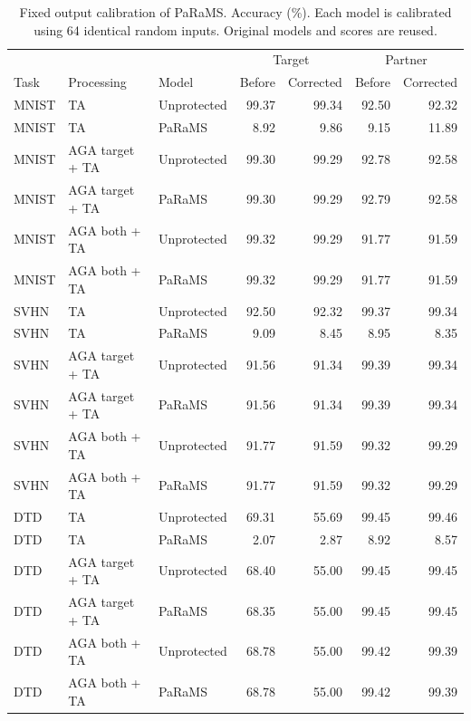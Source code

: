 \begin{table}[t]
\centering
\small
\caption{Fixed output calibration of PaRaMS. Accuracy (\%). Each model is calibrated using 64 identical random inputs. Original models and scores are reused.}
\begin{tabular}{lllrrrr}
\toprule
 & & & \multicolumn{2}{c}{Target} & \multicolumn{2}{c}{Partner} \\
Task & Processing & Model & Before & Corrected & Before & Corrected \\
\midrule
MNIST & TA & Unprotected & 99.37 & 99.34 & 92.50 & 92.32 \\
MNIST & TA & PaRaMS & 8.92 & 9.86 & 9.15 & 11.89 \\
MNIST & AGA target + TA & Unprotected & 99.30 & 99.29 & 92.78 & 92.58 \\
MNIST & AGA target + TA & PaRaMS & 99.30 & 99.29 & 92.79 & 92.58 \\
MNIST & AGA both + TA & Unprotected & 99.32 & 99.29 & 91.77 & 91.59 \\
MNIST & AGA both + TA & PaRaMS & 99.32 & 99.29 & 91.77 & 91.59 \\
SVHN & TA & Unprotected & 92.50 & 92.32 & 99.37 & 99.34 \\
SVHN & TA & PaRaMS & 9.09 & 8.45 & 8.95 & 8.35 \\
SVHN & AGA target + TA & Unprotected & 91.56 & 91.34 & 99.39 & 99.34 \\
SVHN & AGA target + TA & PaRaMS & 91.56 & 91.34 & 99.39 & 99.34 \\
SVHN & AGA both + TA & Unprotected & 91.77 & 91.59 & 99.32 & 99.29 \\
SVHN & AGA both + TA & PaRaMS & 91.77 & 91.59 & 99.32 & 99.29 \\
DTD & TA & Unprotected & 69.31 & 55.69 & 99.45 & 99.46 \\
DTD & TA & PaRaMS & 2.07 & 2.87 & 8.92 & 8.57 \\
DTD & AGA target + TA & Unprotected & 68.40 & 55.00 & 99.45 & 99.45 \\
DTD & AGA target + TA & PaRaMS & 68.35 & 55.00 & 99.45 & 99.45 \\
DTD & AGA both + TA & Unprotected & 68.78 & 55.00 & 99.42 & 99.39 \\
DTD & AGA both + TA & PaRaMS & 68.78 & 55.00 & 99.42 & 99.39 \\
\bottomrule
\end{tabular}
\end{table}

